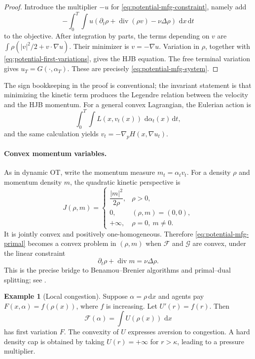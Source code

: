 \documentclass[11pt,a4paper]{article}
\theoremstyle{definition}
\newtheorem{example}[theorem]{Example}
\newcommand{\diverg}{\operatorname{div}}
\newcommand{\dd}{\,\mathrm d}
\newcommand{\abs}[1]{\left\lvert#1\right\rvert}
\newcommand{\al}{\alpha}
\begin{document}
\begin{proof}
Introduce the multiplier $-u$ for
\eqref{eq:potential-mfg-constraint}, namely add
\[
 -\int_0^T\!\int u
  (\partial_t\rho+\diverg(\rho v)-\nu\Delta\rho)\,\dd x\dd t
\]
to the objective.
After integration by parts, the terms depending on $v$ are
$\int\rho(\abs v^2/2+v\cdot\nabla u)$.  Their minimizer is
$v=-\nabla u$.  Variation in $\rho$, together with
\eqref{eq:potential-first-variations}, gives the HJB equation.  The free
terminal variation gives $u_T=G(\cdot,\al_T)$.  These are precisely
\eqref{eq:potential-mfg-system}.
\end{proof}

The sign bookkeeping in the proof is conventional; the invariant statement
is that minimizing the kinetic term produces the Legendre relation between
the velocity and the HJB momentum.  For a general convex Lagrangian, the
Eulerian action is
\begin{equation}\label{eq:general-potential-mfg-action}
  \int_0^T\int L(x,v_t(x))\,\dd\al_t(x)\dd t,
\end{equation}
and the same calculation yields
$v_t=-\nabla_pH(x,\nabla u_t)$.

\paragraph{Convex momentum variables.}
As in dynamic OT, write the momentum measure $m_t=\al_tv_t$.  For a density
$\rho$ and momentum density $m$, the quadratic kinetic perspective is
\begin{equation}\label{eq:mfg-perspective}
  J(\rho,m)=
  \begin{cases}
    \dfrac{\abs m^2}{2\rho},&\rho>0,\\[1mm]
    0,&(\rho,m)=(0,0),\\
    +\infty,&\rho=0,\ m\neq0.
  \end{cases}
\end{equation}
It is jointly convex and positively one-homogeneous.  Therefore
\eqref{eq:potential-mfg-primal} becomes a convex problem in $(\rho,m)$ when
$\mathcal F$ and $\mathcal G$ are convex, under the linear constraint
\begin{equation}\label{eq:mfg-linear-constraint}
  \partial_t\rho+\diverg m=\nu\Delta\rho.
\end{equation}
This is the precise bridge to Benamou--Brenier algorithms and primal--dual
splitting; see \citet{BenamouCarlier2015,BenamouCarlierSantambrogio2017}.

\begin{example}[Local congestion]
Suppose $\al=\rho\dd x$ and agents pay $F(x,\al)=f(\rho(x))$, where $f$
is increasing.  Let $U'(r)=f(r)$.  Then
\[
  \mathcal F(\al)=\int U(\rho(x))\,\dd x
\]
has first variation $F$.  The convexity of $U$ expresses aversion to
congestion.  A hard density cap is obtained by taking $U(r)=+\infty$ for
$r>\kappa$, leading to a pressure multiplier.
\end{example}
\end{document}
